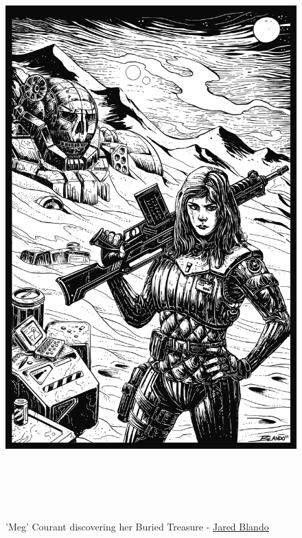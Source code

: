 \begin{figure}[!h]
  \centering
  \includegraphics[alt='MechWarrior finding buried Atlas', width=5.5in, height=8.5in]{img/Buried-Treasure.png}
  \caption*{'Meg' Courant discovering her Buried Treasure - \href{https://jaredblando.com/}{Jared Blando}}
\end{figure}
